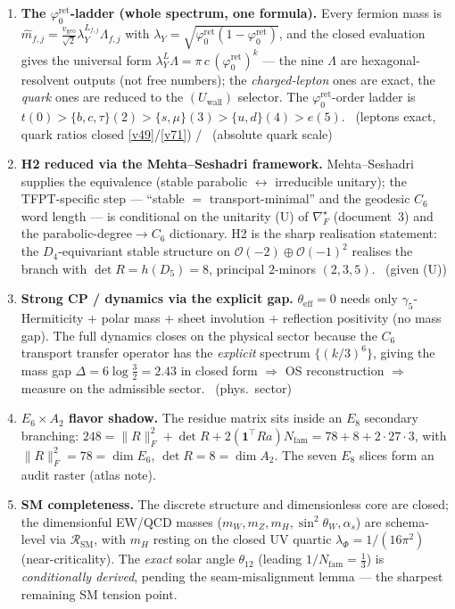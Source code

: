 \documentclass[11pt,a4paper]{article}
\newcommand{\Nfam}{N_{\mathrm{fam}}}
\newcommand{\phiz}{\varphi_0^{\mathrm{ret}}}
\newcommand{\lambdaY}{\lambda_Y}
\newcommand{\vgeo}{v_{\mathrm{geo}}}
\theoremstyle{definition}
\begin{document}
\begin{enumerate}[leftmargin=1.5em]
\item \textbf{The $\phiz$-ladder (whole spectrum, one formula).} Every fermion mass is
  $\hat m_{f,j}=\tfrac{\vgeo}{\sqrt2}\lambdaY^{L_{f,j}}\Lambda_{f,j}$ with
  $\lambdaY=\sqrt{\phiz(1-\phiz)}$, and the closed evaluation gives the universal form
  $\lambdaY^{L}\Lambda=\pi\,c\,(\phiz)^{k}$ --- the nine $\Lambda$ are hexagonal-resolvent outputs (not
  free numbers); the \emph{charged-lepton} ones are exact, the \emph{quark} ones are reduced to the
  $(U_{\mathrm{wall}})$ selector. The $\phiz$-order ladder is
  $t(0)>\{b,c,\tau\}(2)>\{s,\mu\}(3)>\{u,d\}(4)>e(5)$. \mE\ (leptons exact, quark ratios closed \vref{v49}/\vref{v71}) / \mO\ (absolute quark scale)

\item \textbf{H2 reduced via the Mehta--Seshadri framework.} Mehta--Seshadri supplies the equivalence
  (stable parabolic $\leftrightarrow$ irreducible unitary); the TFPT-specific step --- ``stable $=$
  transport-minimal'' and the geodesic $C_6$ word length --- is conditional on the unitarity (U) of
  $\nabla_F^\star$ (document~3) and the parabolic-degree$\to C_6$ dictionary. H2 is the sharp realisation
  statement: the $D_4$-equivariant stable structure on $\mathcal O(-2)\oplus\mathcal O(-1)^2$ realises the
  branch with $\det R=h(D_5)=8$, principal $2$-minors $(2,3,5)$. \mE\ (given (U))

\item \textbf{Strong CP / dynamics via the explicit gap.} $\theta_{\mathrm{eff}}=0$ needs only
  $\gamma_5$-Hermiticity $+$ polar mass $+$ sheet involution $+$ reflection positivity (no mass gap).
  The full dynamics closes on the physical sector because the $C_6$ transport transfer operator has the
  \emph{explicit} spectrum $\{(k/3)^6\}$, giving the mass gap $\Delta=6\log\tfrac32=2.43$ in closed form
  $\Rightarrow$ OS reconstruction $\Rightarrow$ measure on the admissible sector. \mE\ (phys.\ sector)

\item \textbf{$E_6\times A_2$ flavor shadow.} The residue matrix sits inside an $E_8$ secondary
  branching: $248=\|R\|_F^2+\det R+2(\mathbf 1^\top R a)\Nfam=78+8+2\cdot27\cdot3$, with
  $\|R\|_F^2=78=\dim E_6$, $\det R=8=\dim A_2$. The seven $E_8$ slices form an audit raster (atlas note).
  \mO

\item \textbf{SM completeness.} The discrete structure and dimensionless core are closed; the
  dimensionful EW/QCD masses ($m_W,m_Z,m_H,\sin^2\theta_W,\alpha_s$) are schema-level via $\mathcal R_{\mathrm{SM}}$,
  with $m_H$ resting on the closed UV quartic $\lambda_\Phi=1/(16\pi^2)$ (near-criticality). The
  \emph{exact} solar angle $\theta_{12}$ (leading $1/\Nfam=\tfrac13$) is \emph{conditionally derived},
  pending the seam-misalignment lemma --- the sharpest remaining SM tension point. \mC
\end{enumerate}
\end{document}
